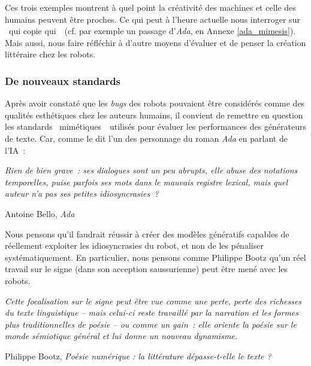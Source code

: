 \documentclass{article}
\newenvironment{citationbox}
{\begin{center}
		\begin{minipage}{.8\textwidth}
		}
		{
		\end{minipage}	
\end{center}
}
\begin{document}
				
				Ces trois exemples montrent à quel point la créativité des machines et celle des humains peuvent être proches. Ce qui peut à l'heure actuelle nous interroger sur \guillemotleft~qui copie qui~\guillemotright~(cf. par exemple un passage d'\textit{Ada}, en Annexe \ref{ada_mimesis}). Mais aussi, nous faire réfléchir à d'autre moyens d'évaluer et de penser la création littéraire chez les robots.

			\subsubsection{De nouveaux standards}
				Après avoir constaté que les \textit{bugs} des robots pouvaient être considérés comme des qualités esthétiques chez les auteurs humains, il convient de remettre en question les standards \guillemotleft~mimétiques~\guillemotright~utilisés pour évaluer les performances des générateurs de texte. Car, comme le dit l'un des personnage du roman \textit{Ada} en parlant de l'IA~:
				\begin{citationbox}
					\textit{Rien de bien grave~: ses dialogues sont un peu abrupts, elle abuse des notations temporelles, puise parfois ses mots dans le mauvais registre lexical, mais quel auteur n'a pas ses petites idiosyncrasies~?}
					\begin{flushright}
						Antoine Bello, \textit{Ada} \autocite{bello2016}
					\end{flushright}
				\end{citationbox}
				Nous pensons qu'il faudrait réussir à créer des modèles génératifs capables de réellement exploiter les idiosyncrasies du robot, et non de les pénaliser systématiquement. En particulier, nous pensons comme Philippe Bootz qu'un réel travail sur le signe (dans son acception saussurienne) peut être mené avec les robots.
				\begin{citationbox}
					\textit{Cette focalisation sur le signe peut être vue comme une perte, perte des richesses du
					texte linguistique -- mais celui-ci reste travaillé par la narration et les formes plus
					traditionnelles de poésie -- ou comme un gain~: elle oriente la poésie sur le monde sémiotique
					général et lui donne un nouveau dynamisme. }
					\begin{flushright}
						Philippe Bootz, \textit{Poésie numérique : la littérature dépasse-t-elle le
						texte ?} \autocite{bootz2005}
					\end{flushright}
				\end{citationbox}
\end{document}
